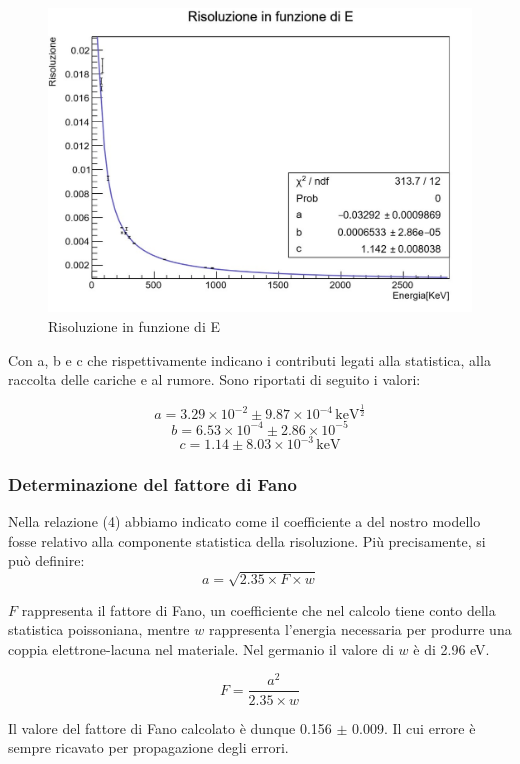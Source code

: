 \documentclass[a4paper,10pt]{article}
\newcommand*{\unit}[1]{\ensuremath{\mathrm{\,#1}}}
\begin{document}
\begin{figure}[H]
    \centering
    \includegraphics[scale=0.45]{grafici/risoluzioneignota}
    \caption{Risoluzione in funzione di E}
\end{figure}

\noindent Con a, b e c che rispettivamente indicano i contributi legati alla statistica, alla raccolta delle cariche e al rumore. Sono riportati di seguito i valori:

$$
	a=3.29 \times 10^{-2} \pm 9.87 \times 10^{-4} \unit{keV^{\frac{1}{2}}}
$$
$$
	b=6.53 \times 10^{-4} \pm 2.86 \times 10^{-5}
$$
$$
	c= 1.14 \pm 8.03 \times 10^{-3} \unit{keV}
$$


\subsubsection{Determinazione del fattore di Fano}

Nella relazione (4) abbiamo indicato come il coefficiente a del nostro modello fosse relativo alla componente statistica della risoluzione. Pi\`u precisamente, si può definire:
$$
	a=\sqrt{2.35 \times F \times w}
$$

\noindent $F$ rappresenta il fattore di Fano, un coefficiente che nel calcolo tiene conto della statistica poissoniana, mentre $w$ rappresenta l'energia necessaria per produrre una coppia elettrone-lacuna nel materiale. Nel germanio il valore di $w$ \`e di 2.96 eV.

$$
	F=\frac{a^2}{2.35 \times w}
$$

\noindent Il valore del fattore di Fano calcolato \`e dunque 0.156 $\pm$ 0.009. Il cui errore è sempre ricavato per propagazione degli errori.
\end{document}
